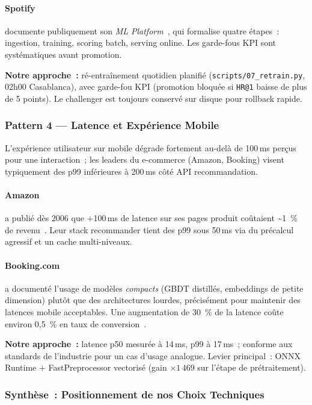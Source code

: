 \documentclass[12pt, a4paper]{report}
\begin{document}
\paragraph{Spotify} documente publiquement son \textit{ML Platform}~\cite{spotify-ml},
qui formalise quatre étapes~: ingestion, training, scoring batch,
serving online. Les garde-fous KPI sont systématiques avant promotion.

\textbf{Notre approche~:} ré-entraînement quotidien planifié
(\texttt{scripts/07\_retrain.py}, 02h00 Casablanca), avec garde-fou KPI
(promotion bloquée si \texttt{HR@1} baisse de plus de 5 points). Le
challenger est toujours conservé sur disque pour rollback rapide.

\subsubsection{Pattern 4 --- Latence et Expérience Mobile}

L'expérience utilisateur sur mobile dégrade fortement au-delà de
100\,ms perçus pour une interaction~; les leaders du e-commerce (Amazon,
Booking) visent typiquement des p99 inférieures à 200\,ms côté API
recommandation.

\paragraph{Amazon} a publié dès 2006 que +100\,ms de latence sur ses
pages produit coûtaient \textasciitilde 1~\% de revenu~\cite{amazon-latency}. Leur stack
recommander tient des p99 sous 50\,ms via du précalcul agressif et un
cache multi-niveaux.

\paragraph{Booking.com} a documenté l'usage de modèles \emph{compacts}
(GBDT distillés, embeddings de petite dimension) plutôt que des
architectures lourdes, précisément pour maintenir des latences mobile
acceptables. Une augmentation de 30~\% de la latence coûte environ
0{,}5~\% en taux de conversion~\cite{booking-ml}.

\textbf{Notre approche~:} latence p50 mesurée à 14\,ms,
p99 à 17\,ms~; conforme aux standards de l'industrie pour un cas
d'usage analogue. Levier principal~: ONNX Runtime + FastPreprocessor
vectorisé (gain $\times 1\,469$ sur l'étape de prétraitement).

\subsubsection{Synthèse~: Positionnement de nos Choix Techniques}
\end{document}
